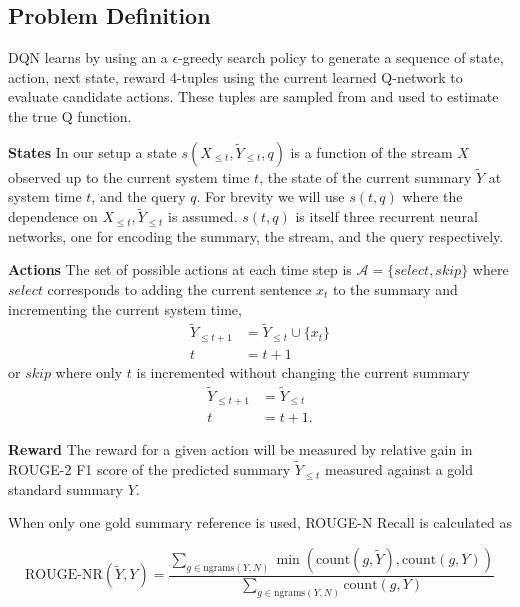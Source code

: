 \documentclass[12pt]{article}
\begin{document}
\subsection{Problem Definition}
   
    DQN learns by using an a $\epsilon$-greedy search policy to generate a 
    sequence of state, action, next state, reward 4-tuples using the current
    learned Q-network to evaluate candidate actions. These tuples are sampled
    from and used to estimate the true Q function.

    \textbf{States} 
    In our setup a state $s(X_{\le t},\tilde{Y}_{\le t}, q)$ is a function
    of the stream $X$ observed up to the current system time $t$, the state
    of the current summary $\tilde{Y}$ at system time $t$, and the query $q$.
    For brevity we will use $s(t,q)$ where the dependence on 
    $X_{\le t},\tilde{Y}_{\le t}$ is assumed.
    $s(t,q)$ is itself three recurrent neural networks, one for encoding 
    the summary, the stream, and the query respectively.

    \textbf{Actions} 
    The set of possible actions at each time step is 
    $\mathcal{A} = \{select, skip\}$ where $select$ corresponds to adding the 
    current sentence $x_t$ to the summary and incrementing the current system
    time, 
    \begin{align*}
        \tilde{Y}_{\le t + 1} &= \tilde{Y}_{\le t} \cup \{ x_t \} \\
        t &= t + 1    
    \end{align*}
    or $skip$ where only $t$ is incremented without changing the current 
    summary
    \begin{align*}
        \tilde{Y}_{\le t + 1} &= \tilde{Y}_{\le t}  \\
        t &= t + 1.
    \end{align*}


    \textbf{Reward} 
    The reward for a given action will be measured by relative gain in 
    ROUGE-2 F1 score of the predicted summary $\tilde{Y}_{\le t}$ measured
    against a gold standard summary $Y$.


     
    When only one gold summary reference is used, ROUGE-N Recall is calculated
    as 

    \[ \textrm{ROUGE-NR}(\tilde{Y}, Y) = 
        \frac{\sum_{g \in \textrm{ngrams}(Y,N)} 
        \min \left(\textrm{count}(g, \tilde{Y}), \textrm{count}(g, Y)\right)}{
        \sum_{g \in \textrm{ngrams}(Y,N)} 
        \textrm{count}(g, Y)
        }
    \]
\end{document}
